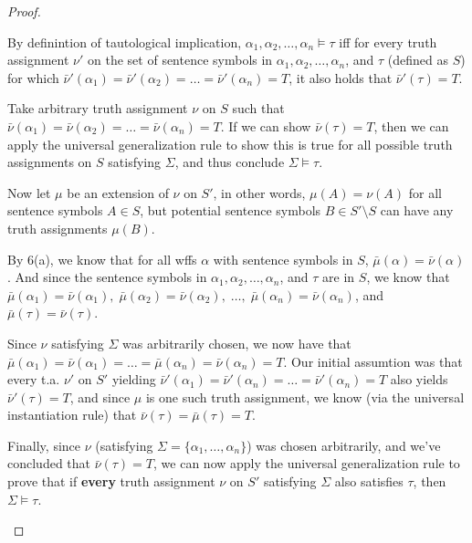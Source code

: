 \documentclass[11pt]{article}
\newcommand{\n}{\vspace{0.5cm}}
\begin{document}
\begin{proof}
\begin{enumerate}
        By definintion of tautological implication, \(\alpha_1, \alpha_2, \hdots, \alpha_n \vDash \tau\) iff for every truth assignment \(\nu'\) on the set of sentence symbols in \(\alpha_1, \alpha_2, \hdots, \alpha_n\), and \(\tau\) (defined as \(S\)) for which \(\bar\nu'(\alpha_1) = \bar\nu'(\alpha_2) = \hdots = \bar\nu'(\alpha_n) = T\), it also holds that \(\bar\nu'(\tau) = T\). \n

        Take arbitrary truth assignment \(\nu\) on \(S\) such that \(\bar\nu(\alpha_1) = \bar\nu(\alpha_2) = \hdots = \bar\nu(\alpha_n) = T\).  If we can show \(\bar\nu(\tau) = T\), then we can apply the universal generalization rule to show this is true for all possible truth assignments on \(S\) satisfying \(\Sigma\), and thus conclude \(\Sigma \vDash \tau\). \n

        Now let \(\mu\) be an extension of \(\nu\) on \(S'\), in other words, \(\mu(A) = \nu(A)\) for all sentence symbols \(A \in S\), but potential sentence symbols \(B \in S' \setminus S\) can have any truth assignments \(\mu(B)\). \n

        By 6(a), we know that for all wffs \(\alpha\) with sentence symbols in \(S\), \(\bar\mu(\alpha) = \bar\nu(\alpha)\).  And since the sentence symbols in \(\alpha_1, \alpha_2, \hdots, \alpha_n\), and \(\tau\) are in \(S\), we know that \(\bar\mu(\alpha_1) = \bar\nu(\alpha_1), \; \bar\mu(\alpha_2) = \bar\nu(\alpha_2), \;\hdots, \; \bar\mu(\alpha_n) = \bar\nu(\alpha_n)\), and \(\bar\mu(\tau) = \bar\nu(\tau)\). \n

        Since \(\nu\) satisfying \(\Sigma\) was arbitrarily chosen, we now have that \(\bar\mu(\alpha_1) = \bar\nu(\alpha_1) = \hdots = \bar\mu(\alpha_n) = \bar\nu(\alpha_n) = T\).  Our initial assumtion was that every t.a. \(\nu'\) on \(S'\) yielding \(\bar\nu'(\alpha_1) = \bar\nu'(\alpha_n) = \hdots = \bar\nu'(\alpha_n) = T\) also yields \(\bar\nu'(\tau) = T\), and since \(\mu\) is one such truth assignment, we know (via the universal instantiation rule) that \(\bar\nu(\tau) = \bar\mu(\tau) = T\). \n

        Finally, since \(\nu\) (satisfying \(\Sigma = \{\alpha_1, \hdots, \alpha_n\}\)) was chosen arbitrarily, and we've concluded that \(\bar\nu(\tau) = T\), we can now apply the universal generalization rule to prove that if \textbf{every} truth assignment \(\nu\) on \(S'\) satisfying \(\Sigma\) also satisfies \(\tau\), then \(\Sigma \vDash \tau\).
    \end{enumerate}
  \end{proof}
  
\end{document}
